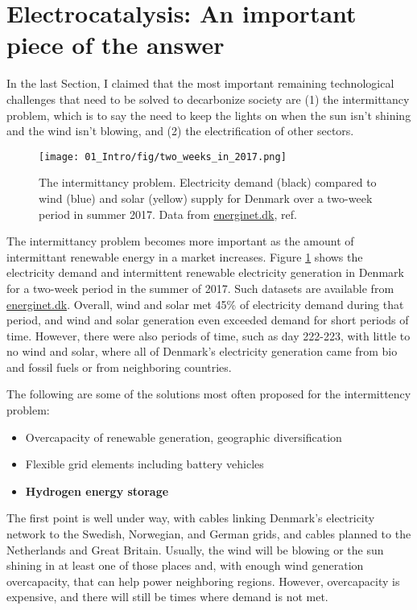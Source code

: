 
\section{Electrocatalysis: An important piece of the answer}\label{sec:our_part}

In the last Section, I claimed that the most important remaining technological challenges that need to be solved to decarbonize society are (1) the intermittancy problem, which is to say the need to keep the lights on when the sun isn't shining and the wind isn't blowing, and (2) the electrification of other sectors.

\begin{figure}[b!]
	\centering
	\texttt{[image: 01\_Intro/fig/two\_weeks\_in\_2017.png]}
	\caption{The intermittancy problem. Electricity demand (black) compared to wind (blue) and solar (yellow) supply for Denmark over a two-week period in summer 2017. Data from \url{energinet.dk}, ref. }
	\label{fig:intermittancy}
\end{figure}

The intermittancy problem becomes more important as the amount of intermittant renewable energy in a market increases. Figure \ref{fig:intermittancy} shows the electricity demand and intermittent renewable electricity generation in Denmark for a two-week period in the summer of 2017. Such datasets are available from \url{energinet.dk}. Overall, wind and solar met 45\% of electricity demand during that period, and wind and solar generation even exceeded demand for short periods of time. However, there were also periods of time, such as day 222-223, with little to no wind and solar, where all of Denmark's electricity generation came from bio and fossil fuels or from neighboring countries.

The following are some of the solutions most often proposed for the intermittency problem\cite{Budischak2013, Sgobbi2016, EU2018}:

\begin{itemize}
	\item Overcapacity of renewable generation, geographic diversification
	
	\item Flexible grid elements including battery vehicles
	
	\item \textbf{Hydrogen energy storage}
\end{itemize}

The first point is well under way, with cables linking Denmark's electricity network to the Swedish, Norwegian, and German grids, and cables planned to the Netherlands and Great Britain. Usually, the wind will be blowing or the sun shining in at least one of those places and, with enough wind generation overcapacity, that can help power neighboring regions. However, overcapacity is expensive, and there will still be times where demand is not met.


